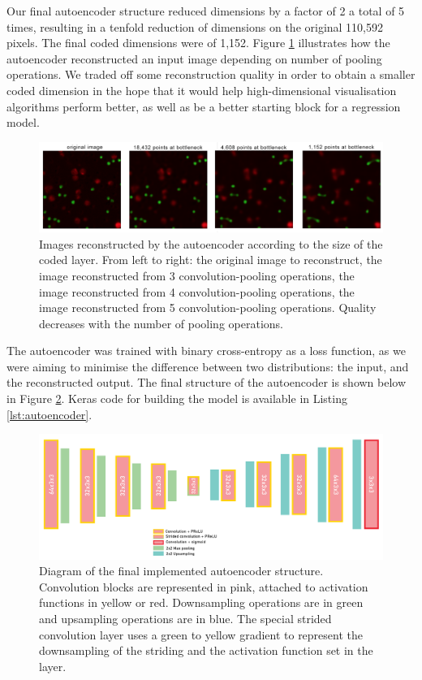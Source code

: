 Our final autoencoder structure reduced dimensions by a factor of 2 a total of 5 times, resulting in a tenfold reduction of dimensions on the original 110,592 pixels. The final coded dimensions were of 1,152. Figure \ref{fig:diff_reconstructions} illustrates how the autoencoder reconstructed an input image depending on number of pooling operations. We traded off some reconstruction quality in order to obtain a smaller coded dimension in the hope that it would help high-dimensional visualisation algorithms perform better, as well as be a better starting block for a regression model. 

\begin{figure}[h]
    \centering
    \includegraphics[width=.95\textwidth]{dissertation/figures/reduction_trade_off.png}
    \caption{Images reconstructed by the autoencoder according to the size of the coded layer. From left to right: the original image to reconstruct, the image reconstructed from 3 convolution-pooling operations, the image reconstructed from 4 convolution-pooling operations, the image reconstructed from 5 convolution-pooling operations. Quality decreases with the number of pooling operations.}
    \label{fig:diff_reconstructions}
\end{figure}

The autoencoder was trained with binary cross-entropy as a loss function, as we were aiming to minimise the difference between two distributions: the input, and the reconstructed output. The final structure of the autoencoder is shown below in Figure \ref{fig:autoencoder_details}. Keras code for building the model is available in Listing \ref{lst:autoencoder}. 

\begin{figure}[h]
    \centering
    \includegraphics[width=.9\textwidth]{dissertation/figures/autoencoder_final_structure.png}
    \caption{Diagram of the final implemented autoencoder structure. Convolution blocks are represented in pink, attached to activation functions in yellow or red. Downsampling operations are in green and upsampling operations are in blue. The special strided convolution layer uses a green to yellow gradient to represent the downsampling of the striding and the activation function set in the layer.}
    \label{fig:autoencoder_details}
\end{figure}

